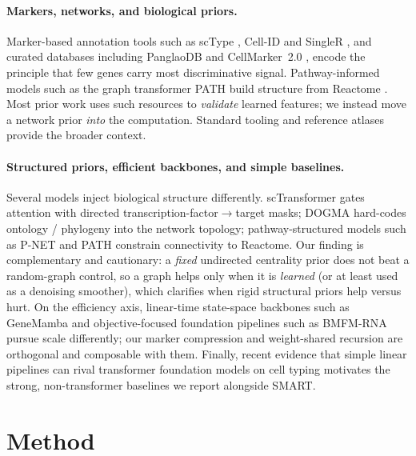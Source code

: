 \documentclass[letterpaper]{article}
\begin{document}
\paragraph{Markers, networks, and biological priors.}
Marker-based annotation tools such as scType \cite{ianevski2022fully}, Cell-ID
\cite{cortal2021cellid} and SingleR \cite{aran2019reference}, and curated databases
including PanglaoDB \cite{franzen2019panglaodb} and CellMarker~2.0
\cite{hu2023cellmarker}, encode the principle that few genes carry most discriminative
signal. Pathway-informed models such as the graph transformer PATH
\cite{howlader2026graph} build structure from Reactome \cite{gillespie2022reactome}.
Most prior work uses such resources to \emph{validate} learned features; we instead
move a network prior \emph{into} the computation. Standard tooling
\cite{wolf2018scanpy,luecken2019current} and reference atlases
\cite{regev2017human,tabula2022tabula} provide the broader context.

\paragraph{Structured priors, efficient backbones, and simple baselines.}
Several models inject biological structure differently. scTransformer
\cite{sctransformer2024} gates attention with directed transcription-factor$\to$target
masks; DOGMA \cite{dogma2024} hard-codes ontology / phylogeny into the network topology;
pathway-structured models such as P-NET \cite{elmarakeby2021biologically} and PATH
\cite{howlader2026graph} constrain connectivity to Reactome. Our finding is complementary
and cautionary: a \emph{fixed} undirected centrality prior does not beat a random-graph
control, so a graph helps only when it is \emph{learned} (or at least used as a denoising
smoother), which clarifies when rigid structural priors help versus hurt. On the
efficiency axis, linear-time state-space backbones such as GeneMamba \cite{genemamba2024}
and objective-focused foundation pipelines such as BMFM-RNA \cite{bmfmrna2025} pursue
scale differently; our marker compression and weight-shared recursion are orthogonal and
composable with them. Finally, recent evidence that simple linear pipelines can rival
transformer foundation models on cell typing \cite{souza2024linear} motivates the strong,
non-transformer baselines we report alongside SMART.

\section{Method}
\end{document}
